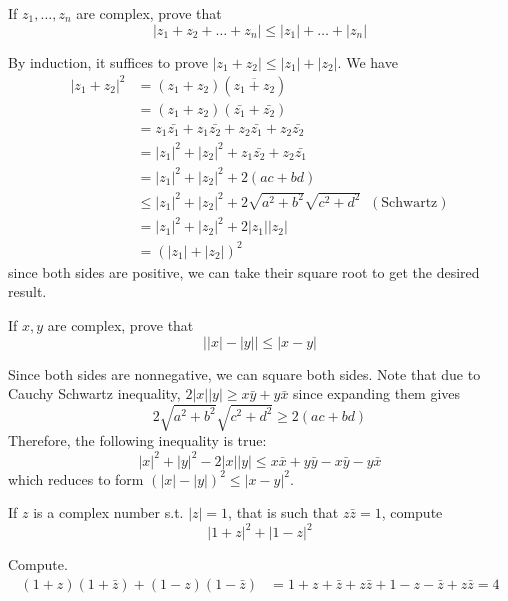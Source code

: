 \documentclass{article}
\begin{document}
    \begin{exercise}[Rudin 1.12]
    If $z_1, \ldots, z_n$ are complex, prove that
    \[|z_1 + z_2 + \ldots + z_n| \leq |z_1| + \ldots + |z_n|\]
    \end{exercise}
    \begin{solution}
    By induction, it suffices to prove $|z_1 + z_2| \leq |z_1| + |z_2|$. We have 
    \begin{align*}
        |z_1 + z_2|^2 & = (z_1 + z_2) (\overline{z_1 + z_2}) \\
        & = (z_1 + z_2) (\bar{z_1} + \bar{z_2}) \\ 
        & = z_1 \bar{z_1} + z_1 \bar{z_2} + z_2 \bar{z_1} + z_2 \bar{z_2} \\
        & = |z_1|^2 + |z_2|^2 + z_1 \bar{z_2} + z_2 \bar{z_1} \\
        & = |z_1|^2 + |z_2|^2 + 2 (a c + bd) \\
        & \leq |z_1|^2 + |z_2|^2 + 2 \sqrt{a^2 + b^2} \sqrt{c^2 + d^2} \;\; (\text{Schwartz}) \\
        & = |z_1|^2 + |z_2|^2 + 2 |z_1| |z_2| \\
        & = (|z_1| + |z_2|)^2
    \end{align*}
    since both sides are positive, we can take their square root to get the desired result. 
    \end{solution}

    \begin{exercise}[Rudin 1.13]
    If $x, y$ are complex, prove that 
    \[\big| |x| - |y| \big| \leq |x - y|\]
    \end{exercise}
    \begin{solution}
    Since both sides are nonnegative, we can square both sides. Note that due to Cauchy Schwartz inequality, $2|x| |y| \geq x \bar{y} + y \bar{x}$ since expanding them gives 
    \[2 \sqrt{a^2 + b^2} \sqrt{c^2 + d^2} \geq 2 (ac + bd)\]
    Therefore, the following inequality is true: 
    \[|x|^2 + |y|^2 - 2 |x| |y| \leq x \bar{x} + y \bar{y} - x \bar{y} - y \bar{x}\]
    which reduces to form $(|x| - |y|)^2 \leq |x - y|^2$. 
    \end{solution}

    \begin{exercise}[Rudin 1.14]
    If $z$ is a complex number s.t. $|z| = 1$, that is such that $z \bar{z} = 1$, compute 
    \[|1 + z|^2 + |1 - z|^2 \]
    \end{exercise}
    \begin{solution}
    Compute. 
    \begin{align*}
        (1 + z) (1 + \bar{z}) + (1 - z) (1 - \bar{z}) & = 1 + z + \bar{z} + z \bar{z} + 1 - z - \bar{z} + z \bar{z} = 4
    \end{align*}
    \end{solution}
\end{document}
